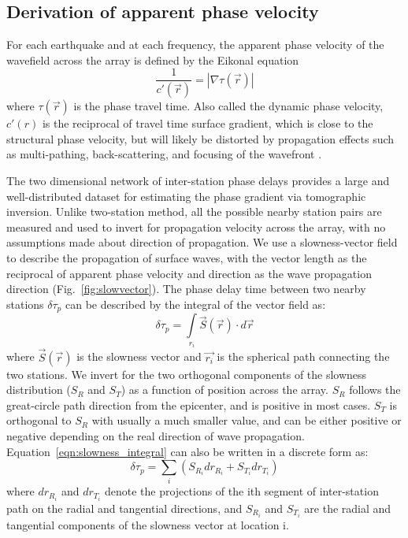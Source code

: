 
\subsection{Derivation of apparent phase velocity}
\label{sec:apv}

For each earthquake and at each frequency, the apparent phase velocity of the wavefield across the array is defined by the Eikonal equation 
\begin{equation}
	\frac{1}{c'(\vec{r})} = |\nabla \tau(\vec{r})|
\end{equation}
where $\tau(\vec{r})$ is the phase travel time. Also called the dynamic phase velocity, $c'(r)$ is the reciprocal of travel time surface gradient, which is close to the structural phase velocity, but will likely be distorted by propagation effects such as multi-pathing, back-scattering, and focusing of the wavefront \citep{Lin:2009fx}.  

The two dimensional network of inter-station phase delays provides a large and well-distributed dataset for estimating the phase gradient via tomographic inversion. 
Unlike two-station method, all the possible nearby station pairs are measured and used to invert for propagation velocity across the array, with no assumptions made about direction of propagation. We use a slowness-vector field to describe the propagation of surface waves, with the vector length as the reciprocal of apparent phase velocity and direction as the wave propagation direction (Fig.~\ref{fig:slowvector}).
The phase delay time between two nearby stations $\delta \tau_p$ can be described by the integral of the vector field as:
\begin{equation}
	\delta \tau_p = \int\limits_{r_i} \vec{S}(\vec{r}) \cdot d\vec{r}
	\label{eqn:slowness_integral}
\end{equation}
where $\vec{S}(\vec{r})$ is the slowness vector and $\vec{r_i}$ is the spherical path connecting the two stations. We invert for the two orthogonal components of the slowness distribution ($S_R$ and $S_T$) as a function of position across the array. $S_R$ follows the great-circle path direction from the epicenter, and is positive in most cases. $S_T$ is orthogonal to $S_R$ with usually a much smaller value, and can be either positive or negative depending on the real direction of wave propagation.
Equation~\ref{eqn:slowness_integral} can also be written in a discrete form as:
\begin{equation}
	\delta \tau_p = \sum_i (S_{R_i}dr_{R_i} + S_{T_i}dr_{T_i})
	\label{eqn:slowness_discrete}
\end{equation}
where $dr_{R_i}$ and $dr_{T_i}$ denote the projections of the ith segment of inter-station path on the radial and tangential directions, and $S_{R_i}$ and $S_{T_i}$ are the radial and tangential components of the slowness vector at location i.


